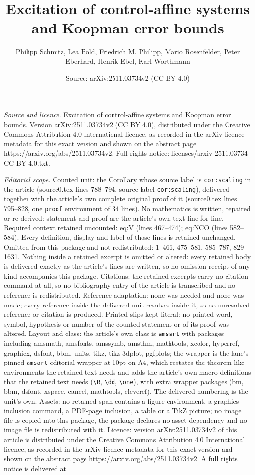 \documentclass[10pt,a4paper]{amsart}
\title[Excitation of control-affine systems and Koopman error bound]{Excitation of control-affine systems and Koopman error bounds}
\author{Philipp Schmitz, Lea Bold, Friedrich M. Philipp, Mario Rosenfelder, Peter Eberhard, Henrik Ebel, Karl Worthmann}
\date{Source: arXiv:2511.03734v2 (CC BY 4.0)}
\begin{document}
\maketitle

\noindent\emph{Source and licence.} Excitation of control-affine systems and Koopman error bounds. Version arXiv:2511.03734v2 (CC BY 4.0), distributed under the Creative Commons Attribution 4.0 International licence, as recorded in the arXiv licence metadata for this exact version and shown on the abstract page https://arxiv.org/abs/2511.03734v2. Full rights notice: licenses/arxiv-2511.03734-CC-BY-4.0.txt.\par\smallskip

\noindent\textit{Editorial scope.} Counted unit: the Corollary whose source label is \texttt{cor:scaling} in the article (source0.tex lines 788--794, source label \texttt{cor:scaling}), delivered together with the article's own complete original proof of it (source0.tex lines 795--828, one \texttt{proof} environment of 34 lines). No mathematics is written, repaired or re-derived: statement and proof are the article's own text line for line. Required context retained uncounted: eq:V (lines 467--474); eq:NCO (lines 582--584). Every definition, display and label of those lines is retained unchanged. Omitted from this package and not redistributed: 1--466, 475--581, 585--787, 829--1631. Nothing inside a retained excerpt is omitted or altered: every retained body is delivered exactly as the article's lines are written, so no omission receipt of any kind accompanies this package. Citations: the retained excerpts carry no citation command at all, so no bibliography entry of the article is transcribed and no reference is redistributed. Reference adaptation: none was needed and none was made; every reference inside the delivered unit resolves inside it, so no unresolved reference or citation is produced. Printed slips kept literal: no printed word, symbol, hypothesis or number of the counted statement or of its proof was altered. Layout and class: the article's own class is \texttt{amsart} with packages including amsmath, amsfonts, amssymb, amsthm, mathtools, xcolor, hyperref, graphicx, dsfont, bbm, units, tikz, tikz-3dplot, pgfplots; the wrapper is the lane's pinned \texttt{amsart} editorial wrapper at 10pt on A4, which restates the theorem-like environments the retained text needs and adds the article's own macro definitions that the retained text needs (\texttt{\textbackslash R}, \texttt{\textbackslash dd}, \texttt{\textbackslash one}), with extra wrapper packages (bm, bbm, dsfont, xspace, cancel, mathtools, cleveref). The delivered numbering is the unit's own. Assets: no retained span contains a figure environment, a graphics-inclusion command, a PDF-page inclusion, a table or a TikZ picture; no image file is copied into this package, the package declares no asset dependency and no image file is redistributed with it. Licence: version arXiv:2511.03734v2 of this article is distributed under the Creative Commons Attribution 4.0 International licence, as recorded in the arXiv licence metadata for this exact version and shown on the abstract page https://arxiv.org/abs/2511.03734v2. A full rights notice is delivered at 
\end{document}
